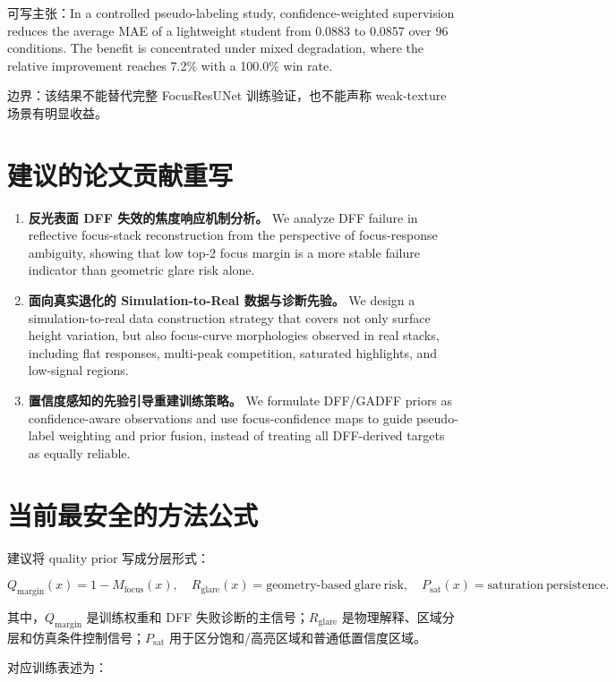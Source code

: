 \documentclass[11pt]{article}
\begin{document}
可写主张：In a controlled pseudo-labeling study, confidence-weighted supervision reduces the average MAE of a lightweight student from 0.0883 to 0.0857 over 96 conditions. The benefit is concentrated under mixed degradation, where the relative improvement reaches 7.2\% with a 100.0\% win rate.

边界：该结果不能替代完整 FocusResUNet 训练验证，也不能声称 weak-texture 场景有明显收益。

\section{建议的论文贡献重写}

\begin{enumerate}
  \item \textbf{反光表面 DFF 失效的焦度响应机制分析。} We analyze DFF failure in reflective focus-stack reconstruction from the perspective of focus-response ambiguity, showing that low top-2 focus margin is a more stable failure indicator than geometric glare risk alone.
  \item \textbf{面向真实退化的 Simulation-to-Real 数据与诊断先验。} We design a simulation-to-real data construction strategy that covers not only surface height variation, but also focus-curve morphologies observed in real stacks, including flat responses, multi-peak competition, saturated highlights, and low-signal regions.
  \item \textbf{置信度感知的先验引导重建训练策略。} We formulate DFF/GADFF priors as confidence-aware observations and use focus-confidence maps to guide pseudo-label weighting and prior fusion, instead of treating all DFF-derived targets as equally reliable.
\end{enumerate}

\section{当前最安全的方法公式}

建议将 quality prior 写成分层形式：

\[
Q_{\mathrm{margin}}(x)=1-M_{\mathrm{focus}}(x),\quad
R_{\mathrm{glare}}(x)=\mathrm{geometry\text{-}based\ glare\ risk},\quad
P_{\mathrm{sat}}(x)=\mathrm{saturation\ persistence}.
\]

其中，$Q_{\mathrm{margin}}$ 是训练权重和 DFF 失败诊断的主信号；$R_{\mathrm{glare}}$ 是物理解释、区域分层和仿真条件控制信号；$P_{\mathrm{sat}}$ 用于区分饱和/高亮区域和普通低置信度区域。

对应训练表述为：
\end{document}
